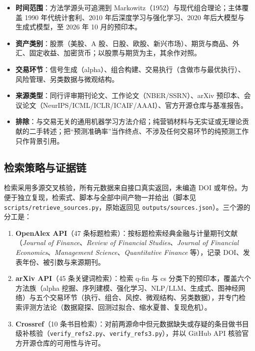 \begin{itemize}
  \item \textbf{时间范围}：方法学源头可追溯到 Markowitz（1952）与现代组合理论；主体覆盖 1990 年代统计套利、2010 年后深度学习与强化学习、2020 年后大模型与生成式模型，至 2026 年 10 月的预印本。
  \item \textbf{资产类别}：股票（美股、A 股、日股、欧股、新兴市场）、期货与商品、外汇、固定收益、加密货币；以股票与期货为主，其余作对照。
  \item \textbf{交易环节}：信号生成（alpha）、组合构建、交易执行（含做市与最优执行）、风险管理、另类数据与微观结构。
  \item \textbf{来源类型}：同行评审期刊论文、工作论文（NBER/SSRN）、arXiv 预印本、会议论文（NeurIPS/ICML/ICLR/ICAIF/AAAI）、官方开源仓库与基准报告。
  \item \textbf{排除}：与交易无关的通用机器学习方法介绍；纯营销材料与无实证或无理论贡献的二手转述；把“预测准确率”当作终点、不涉及任何交易环节的纯预测工作只作背景引用。
\end{itemize}

\subsection{检索策略与证据链}\label{sec:search}

检索采用多源交叉核验，所有元数据来自接口真实返回，未编造 DOI 或年份。为便于独立复现，检索式、脚本与全部中间产物一并给出（脚本见 \texttt{scripts/retrieve\_sources.py}，原始返回见 \texttt{outputs/sources.json}）。三个源的分工是：

\begin{enumerate}
  \item \textbf{OpenAlex API}（47 条标题检索）：按标题检索经典金融与计量期刊文献（\emph{Journal of Finance}、\emph{Review of Financial Studies}、\emph{Journal of Financial Economics}、\emph{Management Science}、\emph{Quantitative Finance} 等），记录 DOI、发表年份、被引数与来源期刊。
  \item \textbf{arXiv API}（45 条关键词检索）：检索 q-fin 与 cs 分类下的预印本，覆盖六个方法族（alpha 挖掘、序列建模、强化学习、NLP/LLM、生成式、图神经网络）与五个交易环节（执行、组合、风控、微观结构、另类数据），并专门检索评测方法论（数据窥探、回测过拟合、缩水夏普、复现危机）。
  \item \textbf{Crossref}（10 条书目检索）：对前两源命中但元数据缺失或存疑的条目做书目级补核验（\texttt{verify\_refs2.py}、\texttt{verify\_refs3.py}），并以 GitHub API 核验官方开源仓库的可用性与许可。
\end{enumerate}


